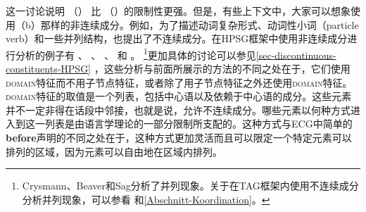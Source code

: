这一讨论说明 （） 比 （）的限制性更强。但是，有些上下文中，大家可以想象使用（b）那样的非连续成分。例如，为了描述动词复杂形式、动词性小词（particle verb）和一些并列结构，也提出了不连续成分\citep{Wells47a}。在HPSG\indexhpsgc 框架中使用非连续成分进行分析的例子有 、 、 、 和 。 \footnote{%
Crysmann、Beaver和Sag分析了并列现象。关于在TAG\indextagc 框架内使用不连续成分分析并列现象，可以参看 和\ref{Abschnitt-Koordination}。%
	}更加具体的讨论可以参见\ref{sec-discontinuous-constituents-HPSG} ，这些分析与前面所展示的方法的不同之处在于，它们使用\textsc{domain}特征而不用子节点特征，或者除了用子节点特征之外还使用\textsc{domain}特征。\textsc{domain}特征的取值是一个列表，包括中心语以及依赖于中心语的成分。这些元素并不一定非得在话段中邻接，也就是说，允许不连续成分。哪些元素以何种方式进入到这一列表是由语言学理论的一部分限制所支配的。这种方式与ECG中简单的\textbf{before}声明的不同之处在于，这种方式更加灵活而且可以限定一个特定元素可以排列的区域，因为元素可以自由地在区域内排列。

